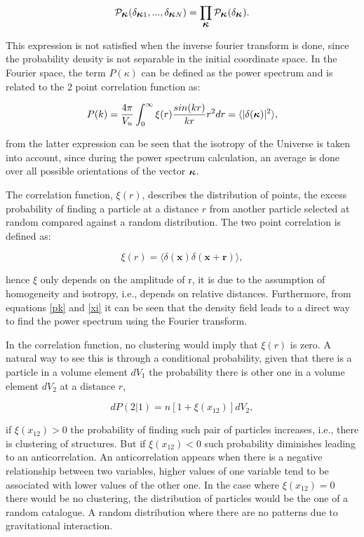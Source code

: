 \[
\mathcal{P}_{\mbox{\boldmath$\kappa$}}(\delta_{\mbox{\boldmath$\kappa$}1},...,\delta_{\mbox{\boldmath$\kappa$}N})=
\prod_{\mbox{\boldmath$\kappa$}}\mathcal{P}_{\mbox{\boldmath$\kappa$}}(\delta_{\mbox{\boldmath$\kappa$}}).
\]


This expression is not satisfied when the inverse fourier transform is done, since the 
probability density is not separable in the initial coordinate space. In the Fourier space,
the term $P(\kappa)$ can be defined as the power spectrum and is related to the 2 point correlation function as:

\begin{equation}
P(k) = \frac{4\pi}{V_u}\int_0^\infty \xi (r)\frac{sin(kr)}{kr}r^2dr =  \langle|\delta(\mbox{\boldmath$\kappa$})|^2\rangle ,
\label{pk}
\end{equation}

from the latter expression can be seen that the isotropy of the Universe is taken into account, since during the power spectrum calculation, an average is done over all  possible orientations of the vector ${\mbox{\boldmath$\kappa$}}$.

The correlation function, $\xi(r)$, describes the distribution of points, the excess probability of finding a particle at a distance $r$ from another particle selected at random compared against a random distribution. The two point correlation is defined as: 

\begin{equation}
\xi (r) =  \langle  \delta(\textbf{x})\delta(\textbf{x}+\textbf{r}) \rangle ,
\label{xi}
\end{equation}

hence $\xi$ only depends on the amplitude of r, it is due to the assumption of homogeneity
and isotropy, i.e., depends on relative distances. 
Furthermore, from equations \ref{pk} and \ref{xi} it can be seen that the density field 
leads to a direct way to find the power spectrum using the Fourier transform.

In the correlation function, no clustering would imply that $\xi(r)$ is zero. 
A natural way to see this is through a conditional probability, given that there 
is a particle in a volume element $dV_1$
the probability there is other one in a volume element $dV_2$ at a distance $r$,

\[dP(2|1) = n[1+\xi(x_{12})]dV_2 ,\]

if $\xi(x_{12})>0$ the probability of finding such pair of particles increases,
i.e., there is clustering of structures. But if $\xi(x_{12})<0$ such probability 
diminishes leading to an anticorrelation.  An anticorrelation appears when there is a negative relationship between two variables, higher values of one variable tend to be associated 
with lower values of the other one. 
In the case where $\xi(x_{12})=0$ there would be no clustering, 
the distribution of particles would be the one of a random catalogue. A random distribution
where there are no patterns due to gravitational interaction.

